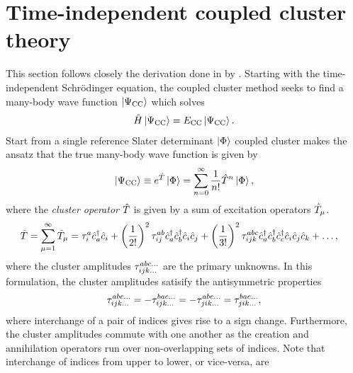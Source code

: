     \section{Time-independent coupled cluster theory}
        This section follows closely the derivation done in
         by
        \citeauthor{crawford2000introduction} \cite{crawford2000introduction}.
        Starting with the time-independent Schrödinger equation, the coupled
        cluster method seeks to find a many-body wave function $\ket{\Psi_{\text{CC}}}$ which
        solves
        \begin{align}
            \hat{H}\ket{\Psi_{\text{CC}}} = E_{\text{CC}}\ket{\Psi_{\text{CC}}}.
        \end{align}
        Start from a single reference Slater determinant $\ket{\Phi}$ coupled
        cluster makes the ansatz that the true many-body wave function is given
        by
        \begin{align}
            \ket{\Psi_{\text{CC}}} \equiv e^{\hat{T}}\ket{\Phi}
            = \sum_{n = 0}^{\infty}\frac{1}{n!}\hat{T}^n\ket{\Phi},
            \label{eq:cc_wave_function}
        \end{align}
        where the \emph{cluster operator} $\hat{T}$ is given by a sum of excitation
        operators $\hat{T}_{\mu}$.
        \begin{align}
            \hat{T} &= \sum_{\mu = 1}^{\infty} \hat{T}_{\mu}
            = \tau^a_i\hat{c}_{a}^{\dagger}\hat{c}_{i}
            + \left( \frac{1}{2!} \right)^2\tau^{ab}_{ij}\hat{c}_{a}^{\dagger}\hat{c}_{b}^{\dagger}\hat{c}_{i}\hat{c}_{j}
            + \left( \frac{1}{3!} \right)^2\tau^{abc}_{ijk}
            \hat{c}_{a}^{\dagger}\hat{c}_{b}^{\dagger}\hat{c}_{c}^{\dagger}\hat{c}_{i}\hat{c}_{j}\hat{c}_{k}
            + \dots,
            \label{eq:cluster-operator}
        \end{align}
        where the cluster amplitudes $\tau^{abc\dots}_{ijk\dots}$ are the
        primary unknowns.
        In this formulation, the cluster amplitudes satisify the antisymmetric
        properties
        \begin{align}
            \tau^{abc\dots}_{ijk\dots}
            = -\tau^{bac\dots}_{ijk\dots}
            = -\tau^{abc\dots}_{jik\dots}
            = \tau^{bac\dots}_{jik\dots},
        \end{align}
        where interchange of a pair of indices gives rise to a sign change.
        Furthermore, the cluster amplitudes commute with one another as the
        creation and annihilation operators run over non-overlapping sets of
        indices.
        Note that interchange of indices from upper to lower, or vice-versa, are
